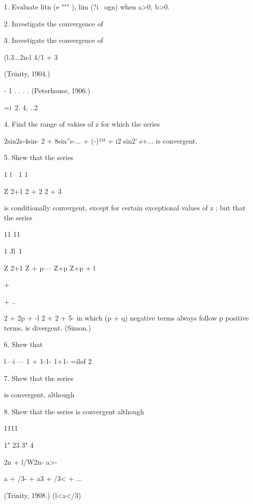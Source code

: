 1. Evaluate litn (e """ ), lim (?i~ ogn) when a>0, b>0.



2. Investigate the convergence of






3. Investigate the convergence of

(l.3...2n-l 4/1 + 3



(Trinity, 1904.)



- 1 . . . . (Peterhouse, 1906.)

 =i\ 2. 4, ..2%

4. Find the range of vakies of z for which the series

2sin2s-4sin- 2 + 8sin''s-... + (-)™ + i2 sin2' s+... is convergent.

5. Shew that the series

1 l\ \ 1 1\

Z 2+1 2 + 2 2 + 3

is conditionally convergent, except for certain exceptional values of
z ; but that the series

11 11



1 Jl\ 1

Z 2+1 Z + p—\ Z+p Z+p + l



+



+ ..



2 + 2p + -l 2 + 2 + 5- in which (p + q) negative terms always follow p
positive terms, is divergent. (Simon.)

6. Shew that

l—i — 1 + 1-1- 1+1- =ilof 2

7. Shew that the series



is convergent, although

8. Shew that the series is convergent although



1111

1" 23 3" 4



 2n + l/W2n- a>-

a + /3- + a3 + /3< + ...



(Trinity, 1908.) (l<a</3)



